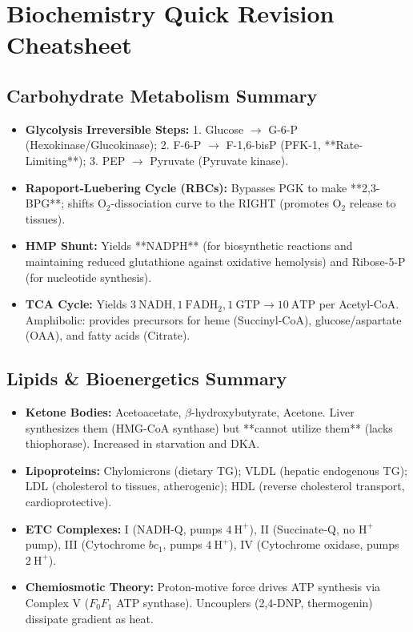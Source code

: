 \documentclass[11pt,a4paper]{article}
\begin{document}
\newpage
\appendix
\section{Biochemistry Quick Revision Cheatsheet}

\subsection{Carbohydrate Metabolism Summary}
\begin{itemize}[leftmargin=*]
    \item \textbf{Glycolysis Irreversible Steps:} 1. Glucose $\rightarrow$ G-6-P (Hexokinase/Glucokinase); 2. F-6-P $\rightarrow$ F-1,6-bisP (PFK-1, **Rate-Limiting**); 3. PEP $\rightarrow$ Pyruvate (Pyruvate kinase).
    \item \textbf{Rapoport-Luebering Cycle (RBCs):} Bypasses PGK to make **2,3-BPG**; shifts $\text{O}_2$-dissociation curve to the RIGHT (promotes $\text{O}_2$ release to tissues).
    \item \textbf{HMP Shunt:} Yields **NADPH** (for biosynthetic reactions and maintaining reduced glutathione against oxidative hemolysis) and Ribose-5-P (for nucleotide synthesis).
    \item \textbf{TCA Cycle:} Yields $3\ \text{NADH}, 1\ \text{FADH}_2, 1\ \text{GTP} \rightarrow 10\ \text{ATP}$ per Acetyl-CoA. Amphibolic: provides precursors for heme (Succinyl-CoA), glucose/aspartate (OAA), and fatty acids (Citrate).
\end{itemize}

\subsection{Lipids \& Bioenergetics Summary}
\begin{itemize}[leftmargin=*]
    \item \textbf{Ketone Bodies:} Acetoacetate, $\beta$-hydroxybutyrate, Acetone. Liver synthesizes them (HMG-CoA synthase) but **cannot utilize them** (lacks thiophorase). Increased in starvation and DKA.
    \item \textbf{Lipoproteins:} Chylomicrons (dietary TG); VLDL (hepatic endogenous TG); LDL (cholesterol to tissues, atherogenic); HDL (reverse cholesterol transport, cardioprotective).
    \item \textbf{ETC Complexes:} I (NADH-Q, pumps $4\ \text{H}^+$), II (Succinate-Q, no $\text{H}^+$ pump), III (Cytochrome $bc_1$, pumps $4\ \text{H}^+$), IV (Cytochrome oxidase, pumps $2\ \text{H}^+$).
    \item \textbf{Chemiosmotic Theory:} Proton-motive force drives ATP synthesis via Complex V ($F_0F_1$ ATP synthase). Uncouplers (2,4-DNP, thermogenin) dissipate gradient as heat.
\end{itemize}
\end{document}
